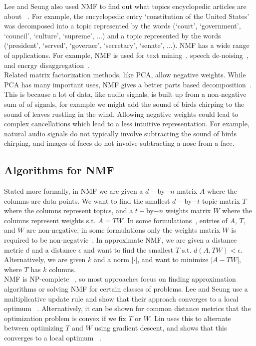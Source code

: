 Lee and Seung also used NMF to find out what topics encyclopedic articles are about ~\cite{leeseung95}. For example, the encyclopedic entry `constitution of the United States' was decomposed into a topic represented by the words (`court', `government', `council', `culture', `supreme', ...) and a topic represented by the words (`president', `served', `governer', `secretary', `senate', ...). NMF has a wide range of applications. For example, NMF is used for text mining~\cite{Berry2005, Murphy2012LearningEA}, speech de-noising~\cite{schmidt-noise}, and energy disaggregation~\cite{Kolter:2010:EDV:2997189.2997318}.
\\

Related matrix factorization methods, like PCA, allow negative weights. While PCA has many important uses, NMF gives a better parts based decomposition~\cite{leeseung95}. This is because a lot of data, like audio signals, is built up from a non-negative sum of of signals, for example we might add the sound of birds chirping to the sound of leaves rustling in the wind. Allowing negative weights could lead to complex cancellations which lead to a less intuitive representation. For example, natural audio signals do not typically involve subtracting the sound of birds chirping, and images of faces do not involve subtracting a nose from a face.

\subsection{Algorithms for NMF}

Stated more formally, in NMF we are given a $d-$by$-n$ matrix $A$ where the columns are data points. We want to find the smallest $d-$by$-t$ topic matrix $T$ where the columns represent topics, and a $t-$by$-n$ weights matrix $W$ where the columns represent weights s.t. $A = TW$. In some formulations~\cite{leeseung95}, entries of $A$, $T$, and $W$ are non-negative, in some formulations only the weights matrix $W$ is required to be non-negatvie~\cite{NIPS2016_6417}. In approximate NMF, we are given a distance metric $d$ and a distance $\epsilon$ and want to find the smallest $T$ s.t. $d(A,TW) < \epsilon$. Alternatively, we are given $k$ and a norm $|\cdot|$, and want to minimize $|A-TW|$, where $T$ has $k$ columns.
\\

NMF is NP-complete ~\cite{nmf-np-complete}, so most approaches focus on finding approximation algorithms or solving NMF for certain classes of problems. Lee and Seung use a multiplicative update rule and show that their approach converges to a local optimum ~\cite{Lee00algorithmsfor}. Alternatively, it can be shown for common distance metrics that the optimization problem is convex if we fix $T$ or $W$. Lin uses this to alternate between optimizing $T$ and $W$ using gradient descent, and shows that this converges to a local optimum ~\cite{lin-grad-optimization}. 
\\

